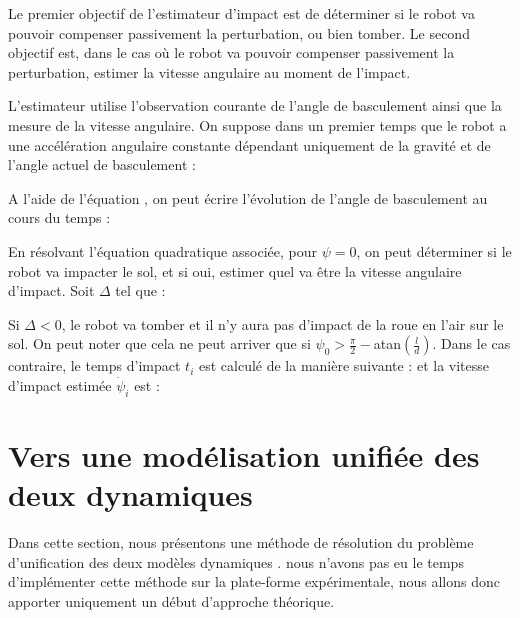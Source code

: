 			Le premier objectif de l'estimateur d'impact est de déterminer si le robot va pouvoir compenser passivement la perturbation, ou bien tomber.
			Le second objectif est, dans le cas où le robot va pouvoir compenser passivement la perturbation, estimer la vitesse angulaire au moment de l'impact.
			
			L'estimateur utilise l'observation courante de l'angle de basculement ainsi que la mesure de la vitesse angulaire.
			On suppose dans un premier temps que le robot a une accélération angulaire constante dépendant uniquement de la gravité et de l'angle actuel de basculement :
			
			A l'aide de l'équation , on peut écrire l'évolution de l'angle de basculement au cours du temps :
			
			En résolvant l'équation quadratique associée, pour $\psi=0$, on peut déterminer si le robot va impacter le sol, et si oui, estimer quel va être la vitesse angulaire d'impact.
			Soit $\Delta$ tel que :
			
			Si $\Delta<0$, le robot va tomber et il n'y aura pas d'impact de la roue en l'air sur le sol. On peut noter que cela ne peut arriver que si $\psi_0 > \frac{\pi}{2}-$atan$(\frac{l}{d})$.
			Dans le cas contraire, le temps d'impact $t_i$ est calculé de la manière suivante :
			et la vitesse d'impact estimée $\dot{\psi}_i$ est :

	\section{Vers une modélisation unifiée des deux dynamiques}
	\label{section.modelisation_unifiee}
	
		Dans cette section, nous présentons une méthode de résolution du problème d'unification des deux modèles dynamiques .
		nous n'avons pas eu le temps d'implémenter cette méthode sur la plate-forme expérimentale, nous allons donc apporter uniquement un début d'approche théorique.
		
